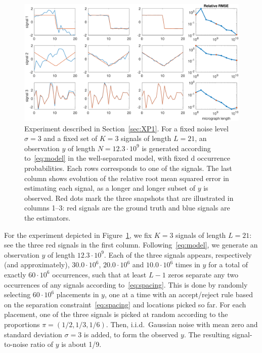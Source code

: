 \documentclass[12pt]{article}
\newcommand{\1}{\mathbf{1}}
\theoremstyle{plain}
\theoremstyle{definition}
\theoremstyle{remark}
\theoremstyle{plain}
\theoremstyle{remark}
\theoremstyle{plain}
\theoremstyle{plain}
\theoremstyle{plain}
\numberwithin{equation}{section}
\begin{document}
\begin{figure}[t]
	\centering
	\includegraphics[width=1\linewidth]{heterogeneous_progressive_n12300000000_466300}
	\caption{Experiment described in Section~\ref{sec:XP1}. For a fixed noise level $\sigma = 3$ and a fixed set of $K = 3$ signals of length $L = 21$, an observation $y$ of length $N = 12.3 \cdot 10^9$ is generated according to~\eqref{eq:model} in the well-separated model, with fixed d occurrence probabilities. Each rows corresponds to one of the signals. The last column shows evolution of the relative root mean squared error in estimating each signal, as a longer and longer subset of $y$ is observed. Red dots mark the three snapshots that are illustrated in columns 1--3: red signals are the ground truth and blue signals are the estimators.}
	\label{fig:1Dheterosignals}
\end{figure}

For the experiment depicted in Figure~\ref{fig:1Dheterosignals}, we fix $K = 3$ signals of length $L = 21$: see the three red signals in the first column. Following~\eqref{eq:model}, we generate an observation $y$ of length $12.3 \cdot 10^9$. Each of the three signals appears, respectively (and approximately), $30.0 \cdot 10^6$, $20.0 \cdot 10^6$ and $10.0 \cdot 10^6$ times in $y$ for a total of exactly $60 \cdot 10^6$ occurrences, such that at least $L-1$ zeros separate any two occurrences of any signals according to~\eqref{eq:spacing}. This is done by randomly selecting $60 \cdot 10^6$ placements in $y$, one at a time with an accept/reject rule based on the separation constraint~\eqref{eq:spacing} and locations picked so far. For each placement, one of the three signals is picked at random according to the proportions $\pi = (1/2, 1/3, 1/6)$. Then, i.i.d.\ Gaussian noise with mean zero and standard deviation $\sigma = 3$ is added, to form the observed $y$. The resulting signal-to-noise ratio of $y$
is about 1/9.
\end{document}
